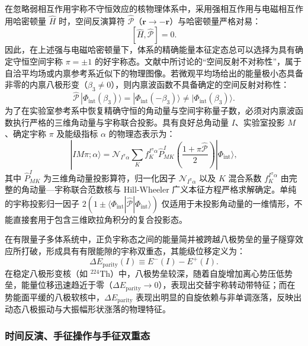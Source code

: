 在忽略弱相互作用宇称不守恒效应的核物理体系中，采用强相互作用与电磁相互作用哈密顿量 $\hat{H}$ 时，空间反演算符 $\hat{\mathcal{P}}$（$\mathbf{r} \to -\mathbf{r}$）与哈密顿量严格对易：
\begin{equation}\label{eq:4-5-parity-commute}
[\hat{H}, \hat{\mathcal{P}}] = 0.
\end{equation}
因此，在上述强与电磁哈密顿量下，体系的精确能量本征定态总可以选择为具有确定守恒空间宇称 $\pi = \pm 1$ 的好宇称态。文献中所讨论的“空间反射不对称性”，属于自洽平均场或内禀参考系近似下的物理图像。若微观平均场给出的能量极小态具备非零的内禀八极形变（$\beta_3 \neq 0$），则内禀波函数不具备确定的空间反射对称性：
\begin{equation}\label{eq:4-5-intrinsic-parity-breaking}
\hat{\mathcal{P}}\,|\Phi_{\mathrm{int}}(\beta_3)\rangle = |\Phi_{\mathrm{int}}(-\beta_3)\rangle \neq |\Phi_{\mathrm{int}}(\beta_3)\rangle .
\end{equation}
为了在实验室参考系中恢复精确守恒的角动量与空间宇称量子数，必须对内禀波函数执行严格的三维角动量与宇称联合投影。具有良好总角动量 $I$、实验室投影 $M$、确定宇称 $\pi$ 及能级指标 $\alpha$ 的物理态表示为：
\begin{equation}\label{eq:4-5-parity-projection}
|I M \pi; \alpha\rangle = \mathcal{N}_{I^\pi \alpha} \sum_K f_K^{I^\pi \alpha} \hat{P}_{MK}^I \left( \frac{1 + \pi \hat{\mathcal{P}}}{2} \right) |\Phi_{\mathrm{int}}\rangle ,
\end{equation}
其中 $\hat{P}_{MK}^I$ 为三维角动量投影算符，归一化因子 $\mathcal{N}_{I^\pi \alpha}$ 以及 $K$ 混合系数 $f_K^{I^\pi \alpha}$ 由完整的角动量---宇称联合范数核与 Hill-Wheeler 广义本征方程严格求解确定。单纯的宇称投影归一因子 $2(1 \pm \langle \Phi_{\mathrm{int}} | \hat{\mathcal{P}} | \Phi_{\mathrm{int}} \rangle)$ 仅适用于未投影角动量的一维情形，不能直接套用于包含三维欧拉角积分的复合投影态。

在有限量子多体系统中，正负宇称态之间的能量简并被跨越八极势垒的量子隧穿效应所打破，形成具有有限能隙的宇称双重态，其能级位移定义为：
\begin{equation}\label{eq:4-5-parity-gap}
\Delta E_{\text{parity}}(I) \equiv E^-(I) - E^+(I).
\end{equation}
在稳定八极形变核（如 $^{224}\mathrm{Th}$）中，八极势垒较深，随着自旋增加离心势压低势垒，能量位移迅速趋近于零（$\Delta E_{\text{parity}} \to 0$），表现出交替宇称转动带特征；而在势能面平缓的八极软核中，$\Delta E_{\text{parity}}$ 表现出明显的自旋依赖与非单调涨落，反映出动态八极振动与大振幅形状涨落的物理特征。

\subsubsection{时间反演、手征操作与手征双重态}

